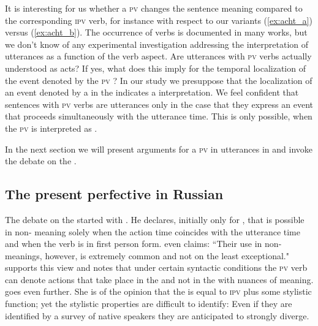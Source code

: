 \documentclass[output=paper,colorlinks,citecolor=brown,newtxmath,hidelinks]{langscibook}
\begin{document}
It is interesting for us whether a \textsc{pv}  changes the sentence meaning compared to the corresponding \textsc{ipv} verb, for instance with respect to our variants (\ref{ex:acht_a}) versus (\ref{ex:acht_b}). The occurrence of    verbs is documented in many works, but we don't know of any experimental investigation addressing the interpretation of  utterances as a function of the verb aspect. Are utterances with \textsc{pv}  verbs actually understood as  acts? If yes, what does this imply for the temporal localization of the event denoted by the \textsc{pv} ? In our study we presuppose that the localization of an event denoted by a  in the  indicates a  interpretation. We feel confident that sentences with \textsc{pv}  verbs are  utterances only in the case that they express an event that proceeds simultaneously with the utterance time. This is only possible, when the \textsc{pv}  is interpreted as  .  

In the next section we will present arguments for a \textsc{pv} in  utterances in  and invoke the debate on the  .

\subsection{The present perfective in Russian}\label{sub:eins:4}

The debate on the   started with \citet{Koschmieder1929}. He declares, initially only for , that   is possible in non- meaning solely when the action time coincides with the utterance time and when the verb is in first person form. \citet[120]{Forsyth1970} even claims: “Their use in non- meanings, however, is extremely common and not on the least exceptional." \citet{Svedova1980} supports this view and notes that under certain syntactic conditions the \textsc{pv} verb can denote actions that take place in the  and not in the  with nuances of meaning. \citet{Rathmayr1976} goes even further. She is of the opinion that the   is equal to \textsc{ipv}  plus some stylistic function; yet the stylistic properties are difficult to identify: Even if they are identified by a survey of native speakers they are anticipated to strongly diverge. 
\end{document}

